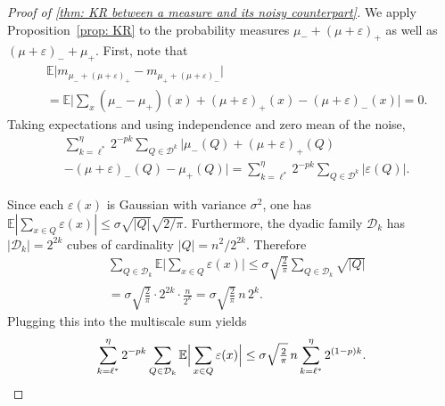 \documentclass{article}
\theoremstyle{plain}
\theoremstyle{definition}
\theoremstyle{remark}
\begin{document}
\begin{proof}[Proof of \cref{thm: KR between a measure and its noisy counterpart}]



We apply Proposition~\ref{prop: KR} to the probability measures $\mu_-+(\mu+\varepsilon)_+$ as well as $(\mu+\varepsilon)_-+ \mu_+$.  
First, note that 
\begin{align}
    &\mathbb{E} \lvert m_{ \mu_-+(\mu + \varepsilon)_+} - m_{\mu_+ +  (\mu + \varepsilon)_-} \rvert
    \\
    &=\mathbb{E} \bigg\lvert \sum_{x} (\mu_- - \mu_+)(x) + (\mu + \varepsilon)_+(x) - (\mu + \varepsilon)_-(x)\bigg\rvert = 0. \nonumber
\end{align}
Taking expectations and using independence and zero mean of the noise,
\begin{align}
    &\sum_{k=\ell^*}^{\eta}
            2^{-pk}
            \sum _{Q\in \mathcal{D}^k}
            \lvert
                \mu_-(Q)+ (\mu + \varepsilon)_+(Q)
                \\&-(\mu + \varepsilon)_-(Q) - \mu_+(Q)
            \rvert  
            = \sum_{k=\ell^*}^{\eta}
            2^{-pk}
            \sum _{Q\in \mathcal{D}^k}
            \lvert
                 \varepsilon(Q)
            \rvert. \nonumber
\end{align}

Since each $\varepsilon(x)$ is Gaussian with variance $\sigma^2$, one has $\mathbb{E}|\sum_{x\in Q}\varepsilon(x)| \le \sigma \sqrt{|Q|}\sqrt{2/\pi}$. Furthermore, the dyadic family $\mathcal{D}_k$ has $|\mathcal{D}_k|=2^{2k}$ cubes of cardinality $|Q|=n^2/2^{2k}$. Therefore
\begin{align}
    &\sum_{Q\in\mathcal{D}_k} \mathbb{E}\Big| \sum_{x\in Q} \varepsilon(x) \Big|
    \le \sigma \sqrt{\tfrac{2}{\pi}} \sum_{Q\in\mathcal{D}_k} \sqrt{|Q|}
    \\&= \sigma \sqrt{\tfrac{2}{\pi}} \cdot 2^{2k} \cdot \frac{n}{2^{k}}
    = \sigma \sqrt{\tfrac{2}{\pi}}\, n\, 2^{k}. \nonumber
\end{align}
Plugging this into the multiscale sum yields
\begin{equation}
 \sum_{k=\ell^*}^{\eta} 2^{-pk} \sum_{Q\in\mathcal{D}_k} \mathbb{E}\Big| \sum_{x\in Q} \varepsilon(x) \Big|
    \le  \sigma \sqrt{\tfrac{2}{\pi}}\, n \sum_{k=\ell^*}^{\eta} 2^{(1-p)k}. \qedhere
\end{equation}


\end{proof}
\end{document}

